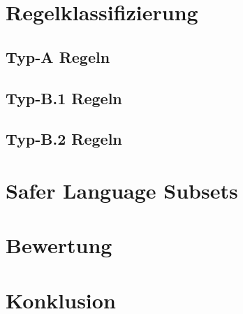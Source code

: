 \documentclass[a4paper,UKenglish,cleveref, autoref]{templates/lipics-v2019}
\begin{document}
\section{Regelklassifizierung}
\label{sec:regelklassifizierung}

\subsection{Typ-A Regeln}
\label{subsec:typ-a-regeln}

\subsection{Typ-B.1 Regeln}
\label{subsec:typ-b-1-regeln}

\subsection{Typ-B.2 Regeln}
\label{subsec:typ-b-2-regeln}

\section{Safer Language Subsets}
\label{sec:safer-language-subsets}

\section{Bewertung}
\label{sec:bewertung}

\section{Konklusion}
\label{sec:konklusion}




\end{document}

